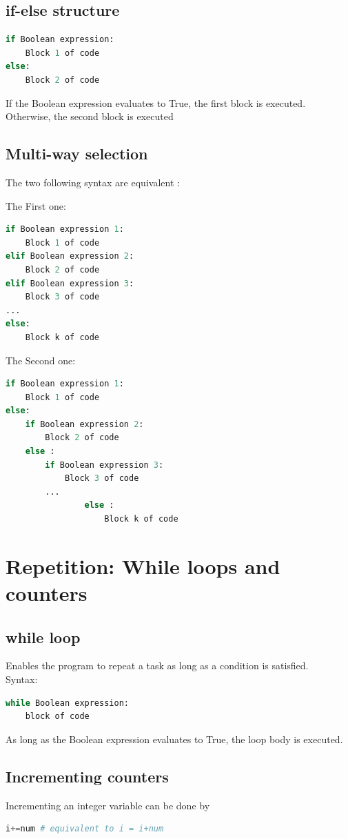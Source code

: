 \documentclass[12pt,oneside]{book}
\begin{document}
\subsection{if-else structure}
\begin{lstlisting}[language=python]
if Boolean expression:
    Block 1 of code 
else:
    Block 2 of code
\end{lstlisting}
If the Boolean expression evaluates to True, the first block is executed.\\
Otherwise, the second block is executed
\pagebreak
\subsection{Multi-way selection}
The two following syntax are equivalent :\\
\begin{minipage}{0.5\linewidth}
	The First one:
	\begin{lstlisting}[language=python]
if Boolean expression 1:
	Block 1 of code 
elif Boolean expression 2:
	Block 2 of code 
elif Boolean expression 3:
	Block 3 of code 
... 
else:	
	Block k of code 
\end{lstlisting}
\end{minipage}
\begin{minipage}{0.5\linewidth}
	The Second one:
	\begin{lstlisting}[language=python]
if Boolean expression 1:
	Block 1 of code 
else: 
	if Boolean expression 2:
		Block 2 of code 
	else :
		if Boolean expression 3:
			Block 3 of code 
		... 
				else :
					Block k of code
\end{lstlisting}
\end{minipage}
\section{Repetition: While loops and counters}
\subsection{while loop}
Enables the program to repeat a task as long as a condition is satisfied.\\
Syntax:
\begin{lstlisting}[language=python]
while Boolean expression:
	block of code
\end{lstlisting}
As long as the Boolean expression evaluates to True, the loop body is executed.
\subsection{Incrementing counters}
Incrementing an integer variable can be done by
\begin{lstlisting}[language=python]
i+=num # equivalent to i = i+num
\end{lstlisting}
\end{document}
